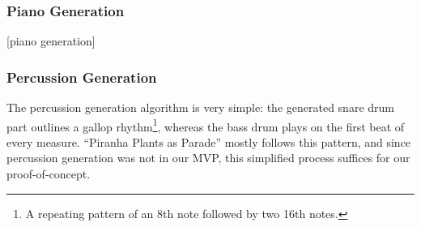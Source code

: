 \subsubsection{Piano Generation}

[piano generation]

\subsubsection{Percussion Generation}

The percussion generation algorithm is very simple: the generated snare drum part outlines a gallop rhythm\footnote{A repeating pattern of an 8th note followed by two 16th notes.}, whereas the bass drum plays on the first beat of every measure. ``Piranha Plants as Parade'' mostly follows this pattern, and since percussion generation was not in our MVP, this simplified process suffices for our proof-of-concept.